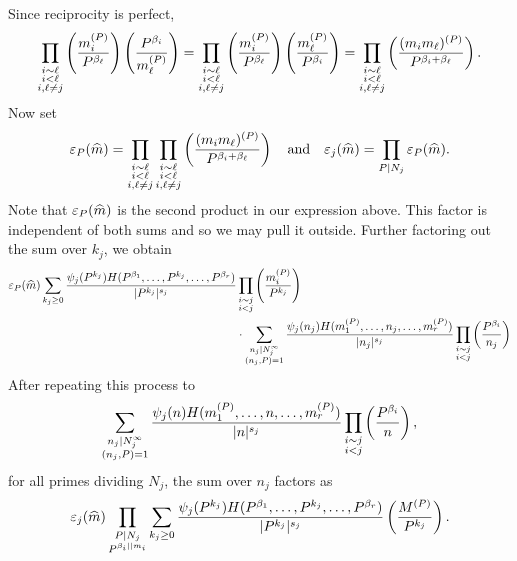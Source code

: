 \documentclass[12pt,reqno,oneside]{amsart}
\begin{document}
    Since reciprocity is perfect,
    \[
        \prod_{\substack{i \sim \ell \\ i < \ell \\ i,\ell \neq j}}\left(\frac{m_{i}^{(P)}}{P^{\beta_{\ell}}}\right)\left(\frac{P^{\beta_{i}}}{m_{\ell}^{(P)}}\right) = \prod_{\substack{i \sim \ell \\ i < \ell \\ i,\ell \neq j}}\left(\frac{m_{i}^{(P)}}{P^{\beta_{\ell}}}\right)\left(\frac{m_{\ell}^{(P)}}{P^{\beta_{i}}}\right) = \prod_{\substack{i \sim \ell \\ i < \ell \\ i,\ell \neq j}}\left(\frac{(m_{i}m_{\ell})^{(P)}}{P^{\beta_{i}+\beta_{\ell}}}\right).
    \]
    Now set
    \[
        \varepsilon_{P}(\widehat{m}) = \prod_{\substack{i \sim \ell \\ i < \ell \\ i,\ell \neq j}}\prod_{\substack{i \sim \ell \\ i < \ell \\ i,\ell \neq j}}\left(\frac{(m_{i}m_{\ell})^{(P)}}{P^{\beta_{i}+\beta_{\ell}}}\right) \quad \text{and} \quad \varepsilon_{j}(\widehat{m}) = \prod_{P \mid N_{j}}\varepsilon_{P}(\widehat{m}).
    \]
    Note that $\varepsilon_{P}(\widehat{m})$ is the second product in our expression above. This factor is independent of both sums and so we may pull it outside. Further factoring out the sum over $k_{j}$, we obtain
    \begin{align*}
        \varepsilon_{P}(\widehat{m})\sum_{k_{j} \ge 0}\frac{\psi_{j}(P^{k_{j}})H(P^{\beta_{1}},\ldots,P^{k_{j}},\ldots,P^{\beta_{r}})}{|P^{k_{j}}|^{s_{j}}}&\prod_{\substack{i \sim j \\ i < j}}\left(\frac{m_{i}^{(P)}}{P^{k_{j}}}\right) \\
        &\cdot \sum_{\substack{n_{j} \mid N_{j}^{\infty} \\ (n_{j},P) = 1}}\frac{\psi_{j}(n_{j})H(m_{1}^{(P)},\ldots,n_{j},\ldots,m_{r}^{(P)})}{|n_{j}|^{s_{j}}}\prod_{\substack{i \sim j \\ i < j}}\left(\frac{P^{\beta_{i}}}{n_{j}}\right)
    \end{align*}
    After repeating this process to
    \[
        \sum_{\substack{n_{j} \mid N_{j}^{\infty} \\ (n_{j},P) = 1}}\frac{\psi_{j}(n)H(m_{1}^{(P)},\ldots,n,\ldots,m_{r}^{(P)})}{|n|^{s_{j}}}\prod_{\substack{i \sim j \\ i < j}}\left(\frac{P^{\beta_{i}}}{n}\right),
    \]
    for all primes dividing $N_{j}$, the sum over $n_{j}$ factors as
    \[
        \varepsilon_{j}(\widehat{m})\prod_{\substack{P \mid N_{j} \\ P^{\beta_{i} \mid\mid m_{i}}}}\sum_{k_{j} \ge 0}\frac{\psi_{j}(P^{k_{j}})H(P^{\beta_{1}},\ldots,P^{k_{j}},\ldots,P^{\beta_{r}})}{|P^{k_{j}}|^{s_{j}}}\left(\frac{M^{(P)}}{P^{k_{j}}}\right).
    \]
\end{document}
